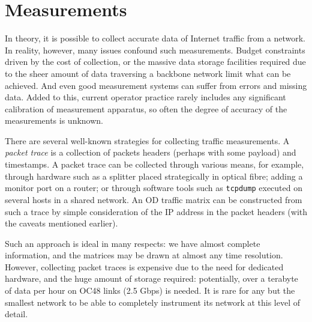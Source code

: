 \clearpage
\section{Measurements}
\label{sec:measurements}

In theory, it is possible to collect accurate data of Internet traffic
from a network. In reality, however, many issues confound such
measurements. Budget constraints driven by the cost of collection, or
the massive data storage facilities required due to the sheer amount
of data traversing a backbone network limit what can be achieved. And
even good measurement systems can suffer from errors and missing
data. Added to this, current operator practice rarely includes any
significant calibration of measurement apparatus, so often the degree
of accuracy of the measurements is unknown.

There are several well-known strategies for collecting traffic
measurements. A {\em packet trace} is a collection of packets headers
(perhaps with some payload) and timestamps.  A packet trace can be
collected through various means, for example, through hardware such as
a splitter placed strategically in optical fibre; adding a monitor
port on a router; or through software tools such as \texttt{tcpdump}
executed on several hosts in a shared network. An OD traffic matrix
can be constructed from such a trace by simple consideration of the IP
address in the packet headers (with the caveats mentioned earlier).

Such an approach is ideal in many respects: we have almost complete
information, and the matrices may be drawn at almost any time
resolution. However, collecting packet traces is expensive due to the
need for dedicated hardware, and the huge amount of storage required:
potentially, over a terabyte of data per hour on OC48 links (2.5 Gbps)
is needed. It is rare for any but the smallest network to be able to
completely instrument its network at this level of detail.


